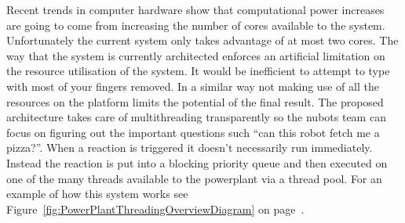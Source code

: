 \documentclass[english,12pt]{scrartcl}
\begin{document}
			Recent trends in computer hardware show that computational power increases are going to come from increasing the number of cores available to the system.
			Unfortunately the current system only takes advantage of at most two cores.
			The way that the system is currently architected enforces an artificial limitation on the resource utilisation of the system.
			It would be inefficient to attempt to type with most of your fingers removed.
			In a similar way not making use of all the resources on the platform limits the potential of the final result.
			The proposed architecture takes care of multithreading transparently so the \gls{nubots} team can
			focus on figuring out the important questions such ``can this robot fetch me a pizza?''.
			When a \gls{reaction} is triggered it doesn't necessarily run immediately.
			Instead the \gls{reaction} is put into a blocking priority queue and then executed on one of the many threads
			available to the \gls{powerplant} via a thread pool.
			For an example of how this system works see Figure~\ref{fig:PowerPlantThreadingOverviewDiagram} on page~\pageref{fig:PowerPlantThreadingOverviewDiagram}.
\end{document}

